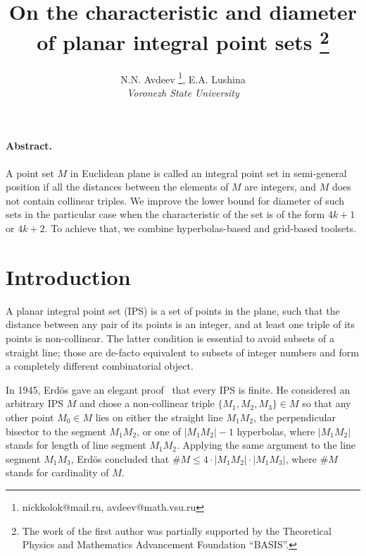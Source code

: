 \documentclass[a4paper,14pt]{article} %
\theoremstyle{plain}
\theoremstyle{definition}
\begin{document}

\title{
	On the characteristic and diameter of planar integral point sets
	\footnote{
		The work of the first author was partially supported by the Theoretical Physics
		and Mathematics Advancement Foundation “BASIS”.
	}
}

\author{
	N.N. Avdeev
	\footnote{nickkolok@mail.ru, avdeev@math.vsu.ru},
	E.A. Lushina
	\\
	\textit{Voronezh State University}
}


\maketitle

\paragraph{Abstract.}
A point set $M$ in Euclidean plane is called an integral point set in semi-general position if all the distances between the
elements of $M$ are integers, and $M$ does not contain collinear triples.
We improve the lower bound for diameter of such sets in the particular case
when the characteristic of the set is of the form $4k+1$ or $4k+2$.
To achieve that, we combine hyperbolas-based and grid-based toolsets.


\section{Introduction}
	A planar integral point set (IPS) is a set of points in the plane, such that the distance between any pair of its points is an integer, and at least one triple of its points is non-collinear. The latter condition is essential to avoid subsets of a straight line; those are de-facto equivalent to subsets of integer numbers and form a completely different combinatorial object.

	In 1945, Erdös gave an elegant proof~\cite{anning1945integral,erdos1945integral} that every IPS is finite.
	He considered an arbitrary IPS $M$ and chose a non-collinear triple $\{M_1, M_2, M_3\} \in M$ so that any other point $M_0 \in M$ lies on either the straight line $M_1M_2$, the perpendicular bisector to the segment $M_1M_2$, or one of $|M_1M_2|-1$ hyperbolas, where $|M_1M_2|$ stands for length of line segment $M_1M_2$.  Applying the same argument to the line segment $M_1M_3$, Erdös concluded that $\#M \le 4 \cdot |M_1M_2| \cdot |M_1M_3|$, where $\#M$ stands for cardinality of $M$.
\end{document}
